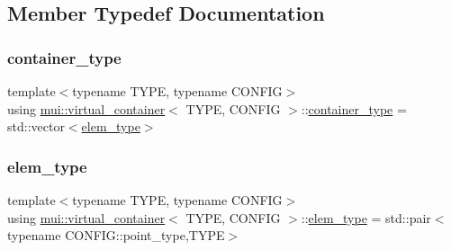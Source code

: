 \subsection{Member Typedef Documentation}
\mbox{\label{classmui_1_1virtual__container_a4f84af2177deb7ad3664c6f5935164be}} 
\subsubsection{\texorpdfstring{container\+\_\+type}{container\_type}}
{\footnotesize\ttfamily template$<$typename T\+Y\+PE, typename C\+O\+N\+F\+IG$>$ \\
using \hyperlink{classmui_1_1virtual__container}{mui\+::virtual\+\_\+container}$<$ T\+Y\+PE, C\+O\+N\+F\+IG $>$\+::\hyperlink{classmui_1_1virtual__container_a4f84af2177deb7ad3664c6f5935164be}{container\+\_\+type} =  std\+::vector$<$\hyperlink{classmui_1_1virtual__container_a5539ad526cf676a5852858dd8da7eca2}{elem\+\_\+type}$>$}

\mbox{\label{classmui_1_1virtual__container_a5539ad526cf676a5852858dd8da7eca2}} 
\subsubsection{\texorpdfstring{elem\+\_\+type}{elem\_type}}
{\footnotesize\ttfamily template$<$typename T\+Y\+PE, typename C\+O\+N\+F\+IG$>$ \\
using \hyperlink{classmui_1_1virtual__container}{mui\+::virtual\+\_\+container}$<$ T\+Y\+PE, C\+O\+N\+F\+IG $>$\+::\hyperlink{classmui_1_1virtual__container_a5539ad526cf676a5852858dd8da7eca2}{elem\+\_\+type} =  std\+::pair$<$typename C\+O\+N\+F\+I\+G\+::point\+\_\+type,T\+Y\+PE$>$}

\mbox{\label{classmui_1_1virtual__container_ab8a791b2f30b5a59f0bcc06b417d10fc}} 
